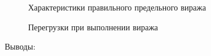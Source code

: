 \begin{figure}[H]
    \caption{Характеристики правильного предельного виража }
    \label{fig:image}
\end{figure}

\begin{figure}[H]
    \caption{Перегрузки при выполнении виража}
    \label{fig:image}
\end{figure}

\begin{center}
    Выводы:
\end{center}

